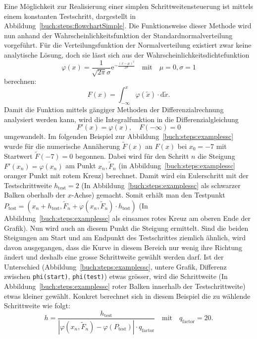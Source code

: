 Eine Möglichkeit zur Realisierung einer simplen Schrittweitensteuerung ist mittels einem konstanten Testschritt,
%
dargestellt in Abbildung~\ref{buch:steps:flowchartSimple}.
Die Funktionsweise dieser Methode wird nun anhand der Wahrscheinlichkeitsfunktion der Standardnormalverteilung vorgeführt.
%
Für die Verteilungsfunktion der Normalverteilung existiert zwar keine analytische Lösung,
%
%
doch sie lässt sich aus der Wahrscheinlichkeitsdichtefunktion
%
\[
  \varphi(x)=\frac{1}{\sqrt{2\pi}\sigma}\mathrm{e}^{-\frac{(x-\mu)^2}{2 \sigma}}\quad \text{mit} \quad \mu=0,\sigma=1
\]
berechnen:
\[
  F(x)=\int_{-\infty}^{x} \varphi (\tilde{x}) \cdot \mathrm{d} \tilde{x}.
\]
Damit die Funktion mittels gängiger Methoden der Differenzialrechnung analysiert werden kann,
wird die Integralfunktion in die Differenzialgleichung
%
\[
  F'(x)=\varphi(x), \quad F(-\infty)=0
\]
umgewandelt.
Im folgenden Beispiel zur Abbildung~\ref{buch:steps:examplessc}
wurde für die numerische Annäherung $\tilde{F}(x)$ an $F(x)$ bei $x_0=-7$ mit Startwert $\tilde{F}(-7)=0$ begonnen.
Dabei wird für den Schritt $n$ die Steigung $F'(x_n)=\varphi(x_n)$ am Punkt $x_{n}, \tilde{F}_{n}$ (in Abbildung~\ref{buch:steps:examplessc} oranger Punkt mit rotem Kreuz) berechnet.
Damit wird ein Eulerschritt mit der Testschrittweite $h_\text{test}=2$ (In Abbildung~\ref{buch:steps:examplessc} als schwarzer Balken oberhalb der $x$-Achse) gemacht.
Somit erhält man den Testpunkt 
$P_\text{test}=(x_n+h_\text{test}, \tilde{F}_n+\varphi(x_n, \tilde{F}_n) \cdot h_\text{test})$
(In Abbildung~\ref{buch:steps:examplessc} als einsames rotes Kreuz am oberen Ende der Grafik).
Nun wird auch an diesem Punkt die Steigung ermittelt.
Sind die beiden Steigungen am Start und am Endpunkt des Testschrittes ziemlich ähnlich, wird davon ausgegangen,
dass die Kurve in diesem Bereich nur wenig ihre Richtung ändert und deshalb eine grosse Schrittweite gewählt werden darf.
Ist der Unterschied (Abbildung~\ref{buch:steps:examplessc},
untere Grafik, Differenz zwischen \texttt{phi(start)}, \texttt{phi(test)}) etwas grösser,
wird die Schrittweite (In Abbildung~\ref{buch:steps:examplessc} roter Balken innerhalb der Testschrittweite) etwas kleiner gewählt.
Konkret berechnet sich in diesem Beispiel die zu wählende Schrittweite wie folgt:
\begin{equation}
  h=\frac{h_{\text{test}}}{|\varphi(x_n, \tilde{F}_n)-\varphi(P_{\text{test}})|\cdot q_{\text{factor}}}\quad \text{mit} \quad q_{\text{factor}}=20.
  \label{buch:steps:equationSimpleStepSize}
\end{equation}
